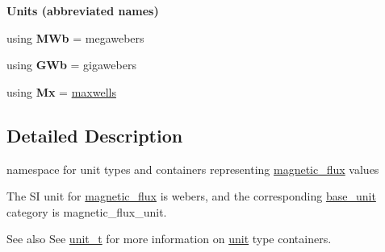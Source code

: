 \begin{Indent}{\bf Units (abbreviated names)}
\begin{DoxyCompactItemize}
\item 
\hypertarget{namespaceunits_1_1magnetic__flux_a0e09f2e014fb0390e22c7cab15f9c623}{}using {\bfseries M\+Wb} = megawebers\label{namespaceunits_1_1magnetic__flux_a0e09f2e014fb0390e22c7cab15f9c623}

\item 
\hypertarget{namespaceunits_1_1magnetic__flux_a64d361d735631265c0f83d00a13d7c97}{}using {\bfseries G\+Wb} = gigawebers\label{namespaceunits_1_1magnetic__flux_a64d361d735631265c0f83d00a13d7c97}

\item 
\hypertarget{namespaceunits_1_1magnetic__flux_a9a98f04ea2ce42c087825a848fe27e02}{}using {\bfseries Mx} = \hyperlink{structunits_1_1unit}{maxwells}\label{namespaceunits_1_1magnetic__flux_a9a98f04ea2ce42c087825a848fe27e02}

\end{DoxyCompactItemize}
\end{Indent}


\subsection{Detailed Description}
namespace for unit types and containers representing \hyperlink{namespaceunits_1_1magnetic__flux}{magnetic\+\_\+flux} values 

The S\+I unit for \hyperlink{namespaceunits_1_1magnetic__flux}{magnetic\+\_\+flux} is {\ttfamily webers}, and the corresponding {\ttfamily \hyperlink{structunits_1_1base__unit}{base\+\_\+unit}} category is {\ttfamily magnetic\+\_\+flux\+\_\+unit}. \begin{DoxySeeAlso}{See also}
See \hyperlink{classunits_1_1unit__t}{unit\+\_\+t} for more information on \hyperlink{structunits_1_1unit}{unit} type containers. 
\end{DoxySeeAlso}
